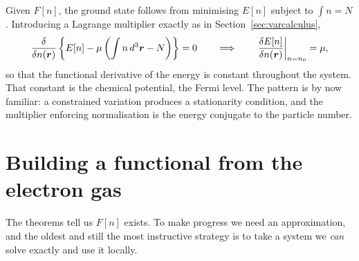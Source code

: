 Given $F[n]$, the ground state follows from minimising $E[n]$ subject to
$\int n = N$.  Introducing a Lagrange multiplier exactly as in
Section~\ref{sec:varcalculus},
\begin{equation}
  \frac{\delta}{\delta n(\bm{r})}
  \left\{E[n]-\mu\left(\int n\,d^3\bm{r}-N\right)\right\} = 0
  \qquad\Longrightarrow\qquad
  \left.\frac{\delta E[n]}{\delta n(\bm{r})}\right\vert_{n=n_0} = \mu ,
  \label{eq:8-eulerequation}
\end{equation}
so that the functional derivative of the energy is constant throughout the
system.  That constant is the chemical potential, the Fermi level.  The
pattern is by now familiar: a constrained variation produces a stationarity
condition, and the multiplier enforcing normalisation is the energy conjugate
to the particle number.

\section{Building a functional from the electron gas}
\label{sec:functionalfromgas}

The theorems tell us $F[n]$ exists.  To make progress we need an
approximation, and the oldest and still the most instructive strategy is to
take a system we \emph{can} solve exactly and use it locally.

